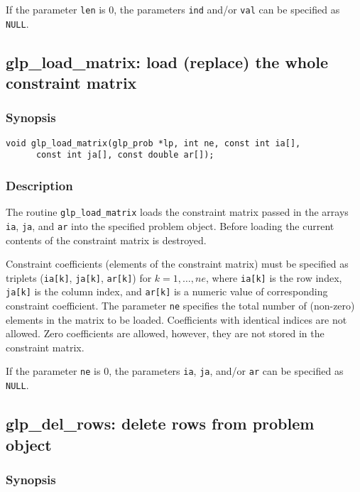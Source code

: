 If the parameter \verb|len| is 0, the parameters \verb|ind| and/or
\verb|val| can be specified as \verb|NULL|.

\subsection{glp\_load\_matrix: load (replace) the whole constraint
matrix}

\subsubsection*{Synopsis}

\begin{verbatim}
void glp_load_matrix(glp_prob *lp, int ne, const int ia[],
      const int ja[], const double ar[]);
\end{verbatim}

\subsubsection*{Description}

The routine \verb|glp_load_matrix| loads the constraint matrix passed
in  the arrays \verb|ia|, \verb|ja|, and \verb|ar| into the specified
problem object. Before loading the current contents of the constraint
matrix is destroyed.

Constraint coefficients (elements of the constraint matrix) must be
specified as triplets (\verb|ia[k]|, \verb|ja[k]|, \verb|ar[k]|) for
$k=1,\dots,ne$, where \verb|ia[k]| is the row index, \verb|ja[k]| is
the column index, and \verb|ar[k]| is a numeric value of corresponding
constraint coefficient. The parameter \verb|ne| specifies the total
number of (non-zero) elements in the matrix to be loaded. Coefficients
with identical indices are not allowed. Zero coefficients are allowed,
however, they are not stored in the constraint matrix.

If the parameter \verb|ne| is 0, the parameters \verb|ia|, \verb|ja|,
and/or \verb|ar| can be specified as \verb|NULL|.

\subsection{glp\_del\_rows: delete rows from problem object}

\subsubsection*{Synopsis}

